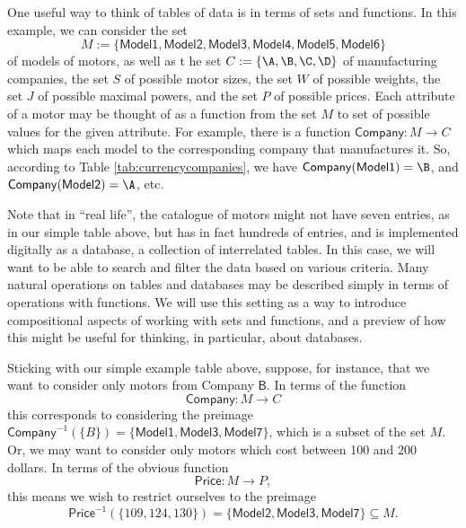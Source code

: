 One useful way to think of tables of data is in terms of sets and functions. In this example, we can consider the set
$$
M := \{ \mathsf{Model1}, \mathsf{Model2}, \mathsf{Model3}, \mathsf{Model4}, \mathsf{Model5}, \mathsf{Model6} \}
$$ 
of models of motors, as well as t he set $C := \{ \A, \B, \C, \D \}$ of manufacturing companies, the set $S$ of possible motor sizes, the set $W$ of possible weights, the set $J$ of possible maximal powers, and the set $P$ of possible prices. Each attribute of a motor may be thought of as a function from the set $M$ to set of possible values for the given attribute. For example, there is a function $\mathsf{Company}: M \longrightarrow C$ which maps each model to the corresponding company that manufactures it. So, according to Table \ref{tab:currencycompanies}, we have  $\mathsf{Company}(\mathsf{Model1}) = \B$, and $\mathsf{Company}(\mathsf{Model2}) = \A$, etc.

Note that in ``real life'', the catalogue of motors might not have seven entries, as in our simple table above, but has in fact hundreds of entries, and is implemented digitally as a database,  a collection of interrelated tables. In this case, we will want to be able to search and filter the data based on various criteria. Many natural operations on tables and databases may be described simply in terms of operations with functions. We will use this setting as a way to introduce compositional aspects of working with sets and functions, and a preview of how this might be useful for thinking, in particular, about databases. 

Sticking with our simple example table above, suppose, for instance, that we want to consider only motors from Company $\mathsf{B}$. In terms of the function
$$
\mathsf{Company}: M \longrightarrow C
$$
this corresponds to considering the preimage $\mathsf{Company}^{-1}(\{ B \}) = \{ \mathsf{Model1}, \mathsf{Model3}, \mathsf{Model7} \}$, which is a subset of the set $M$. Or, we may want to consider only motors which cost between 100 and 200 dollars. In terms of the obvious function
$$
\mathsf{Price}: M \longrightarrow P,
$$
this means we wish to restrict ourselves to the preimage 
$$
\mathsf{Price}^{-1}(\{ 109, 124, 130\}) = \{ \mathsf{Model2}, \mathsf{Model3}, \mathsf{Model7} \} \subseteq M.
$$

